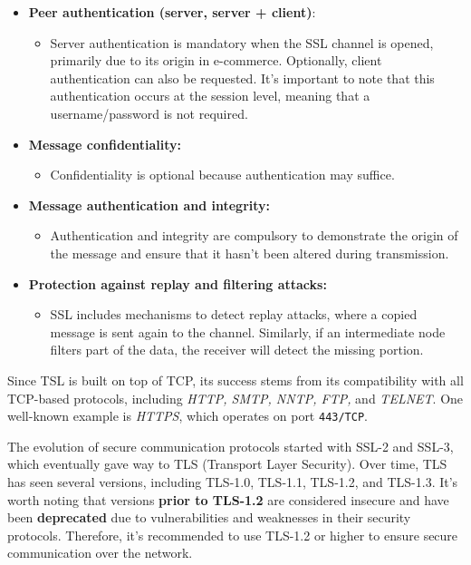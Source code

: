 \begin{itemize}
    \item \textbf{Peer authentication (server, server + client)}:
          \begin{itemize}
              \item Server authentication is mandatory when the SSL channel is opened, primarily due to its origin in e-commerce. Optionally, client authentication can also be requested. It's important to note that this authentication occurs at the session level, meaning that a username/password is not required.
          \end{itemize}

    \item \textbf{Message confidentiality:}
          \begin{itemize}
              \item Confidentiality is optional because authentication may suffice.
          \end{itemize}

    \item \textbf{Message authentication and integrity:}
          \begin{itemize}
              \item Authentication and integrity are compulsory to demonstrate the origin of the message and ensure that it hasn't been altered during transmission.
          \end{itemize}

    \item \textbf{Protection against replay and filtering attacks:}
          \begin{itemize}
              \item SSL includes mechanisms to detect replay attacks, where a copied message is sent again to the channel. Similarly, if an intermediate node filters part of the data, the receiver will detect the missing portion.
          \end{itemize}
\end{itemize}

Since TSL is built on top of TCP, its success stems from its compatibility with all TCP-based protocols, including \textit{HTTP, SMTP, NNTP, FTP,} and \textit{TELNET}. One well-known example is \textit{HTTPS}, which operates on port \texttt{443/TCP}.

The evolution of secure communication protocols started with SSL-2 and SSL-3, which eventually gave way to TLS (Transport Layer Security). Over time, TLS has seen several versions, including TLS-1.0, TLS-1.1, TLS-1.2, and TLS-1.3.
It's worth noting that versions \textbf{prior to TLS-1.2} are considered insecure and have been \textbf{deprecated} due to vulnerabilities and weaknesses in their security protocols. Therefore, it's recommended to use TLS-1.2 or higher to ensure secure communication over the network.


